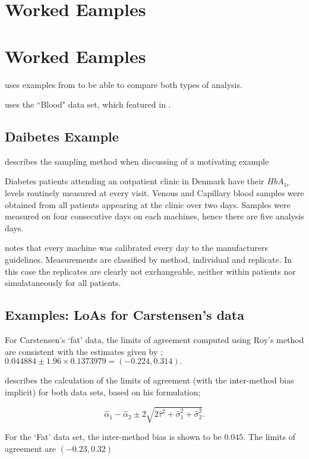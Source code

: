 \documentclass[12pt, a4paper]{report}
\theoremstyle{plain}
\theoremstyle{definition}
\theoremstyle{remark}
\begin{document}
	\section{Worked Eamples}
	\section{Worked Eamples}
	
	\citet{ARoy2009} uses examples from \citet{BA86} to be able to
	compare both types of analysis.
	
	\citet{Roy2006} uses the ``Blood" data set, which featured in \citet{BA99}.
	
	\subsection{Daibetes Example}
	\citet{bxc2008} describes the sampling method when discussing of a motivating example
	
	Diabetes patients attending an outpatient clinic in Denmark have their $HbA_{1c}$ levels routinely measured at every visit. Venous and Capillary blood samples were obtained from all patients appearing at the clinic over two days. Samples were measured on four consecutive days on each machines, hence there are five analysis days.
	
	\citet{bxc2008} notes that every machine was calibrated every day to  the manufacturers guidelines.
	Measurements are classified by method, individual and replicate. In this case the replicates are clearly not exchangeable, neither within patients nor simulataneously for all patients.
	
	\subsection{Examples: LoAs for Carstensen's data}
	
	For Carstensen's `fat' data, the limits of agreement computed using Roy's
	method are consistent with the estimates given by \citet{BXC2008}; $0.044884  \pm 1.96 \times  0.1373979 = (-0.224,  0.314).$	
	
	
	\citet{bxc2008} describes the calculation of the limits of agreement (with the inter-method bias implicit) for both data sets, based on his formulation;
	
	\[\hat{\alpha}_1 - \hat{\alpha}_2 \pm 2\sqrt{2\hat{\tau}^2 +\hat{\sigma}_1^2 +\hat{\sigma}_2^2 }.\]
	
	For the `Fat' data set, the inter-method bias is shown to be $0.045$. The limits of agreement are $(-0.23 , 0.32)$
	
\end{document}
